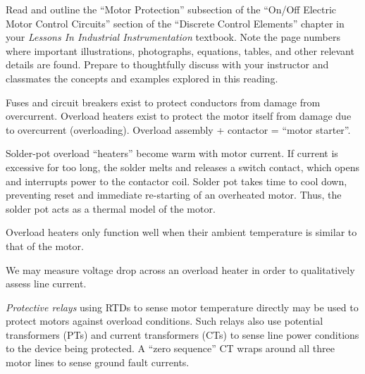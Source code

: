 

Read and outline the ``Motor Protection'' subsection of the ``On/Off Electric Motor Control Circuits'' section of the ``Discrete Control Elements'' chapter in your {\it Lessons In Industrial Instrumentation} textbook.  Note the page numbers where important illustrations, photographs, equations, tables, and other relevant details are found.  Prepare to thoughtfully discuss with your instructor and classmates the concepts and examples explored in this reading.














Fuses and circuit breakers exist to protect conductors from damage from overcurrent.  Overload heaters exist to protect the motor itself from damage due to overcurrent (overloading).  Overload assembly + contactor = ``motor starter''.

\vskip 10pt

Solder-pot overload ``heaters'' become warm with motor current.  If current is excessive for too long, the solder melts and releases a switch contact, which opens and interrupts power to the contactor coil.  Solder pot takes time to cool down, preventing reset and immediate re-starting of an overheated motor.  Thus, the solder pot acts as a thermal model of the motor.

\vskip 10pt

Overload heaters only function well when their ambient temperature is similar to that of the motor.  

\vskip 10pt

We may measure voltage drop across an overload heater in order to qualitatively assess line current.

\vskip 10pt

{\it Protective relays} using RTDs to sense motor temperature directly may be used to protect motors against overload conditions.  Such relays also use potential transformers (PTs) and current transformers (CTs) to sense line power conditions to the device being protected.  A ``zero sequence'' CT wraps around all three motor lines to sense ground fault currents.










